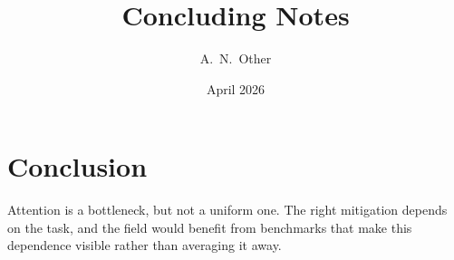 \documentclass[11pt]{article}
\title{Concluding Notes}
\author{A.\ N.\ Other}
\date{April 2026}
\begin{document}
\maketitle

\section{Conclusion}

Attention is a bottleneck, but not a uniform one.
The right mitigation depends on the task, and the field would benefit from benchmarks that make this dependence visible rather than averaging it away.
\end{document}
